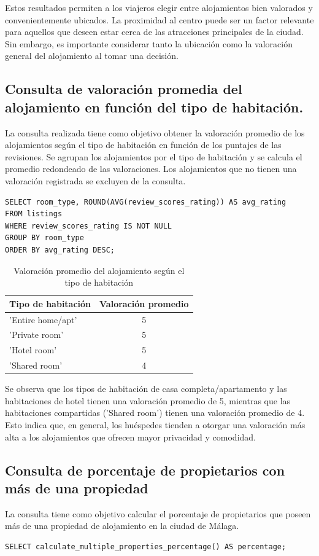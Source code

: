 Estos resultados permiten a los viajeros elegir entre alojamientos bien valorados y convenientemente ubicados. La proximidad al centro puede ser un factor relevante para aquellos que deseen estar cerca de las atracciones principales de la ciudad. Sin embargo, es importante considerar tanto la ubicación como la valoración general del alojamiento al tomar una decisión.

\subsection{Consulta de valoración promedia del alojamiento en función del tipo de habitación.}
La consulta realizada tiene como objetivo obtener la valoración promedio de los alojamientos según el tipo de habitación en función de los puntajes de las revisiones. Se agrupan los alojamientos por el tipo de habitación y se calcula el promedio redondeado de las valoraciones. Los alojamientos que no tienen una valoración registrada se excluyen de la consulta.

\begin{verbatim}
SELECT room_type, ROUND(AVG(review_scores_rating)) AS avg_rating
FROM listings
WHERE review_scores_rating IS NOT NULL
GROUP BY room_type
ORDER BY avg_rating DESC;
\end{verbatim}

\begin{table}[h]
\centering

\begin{tabular}{|l|c|}
\hline
\textbf{Tipo de habitación} & \textbf{Valoración promedio} \\
\hline
'Entire home/apt' & 5 \\ \hline
'Private room' & 5 \\ \hline
'Hotel room' & 5 \\ \hline
'Shared room' & 4 \\ \hline
\end{tabular}
\caption{Valoración promedio del alojamiento según el tipo de habitación}
\end{table}

Se observa que los tipos de habitación de casa completa/apartamento y las habitaciones de hotel tienen una valoración promedio de 5, mientras que las habitaciones compartidas ('Shared room') tienen una valoración promedio de 4. Esto indica que, en general, los huéspedes tienden a otorgar una valoración más alta a los alojamientos que ofrecen mayor privacidad y comodidad.
\newpage
\subsection{Consulta de porcentaje de propietarios con más de una propiedad}
La consulta tiene como objetivo calcular el porcentaje de propietarios que poseen más de una propiedad de alojamiento en la ciudad de Málaga.
\begin{verbatim}
SELECT calculate_multiple_properties_percentage() AS percentage;
\end{verbatim}

